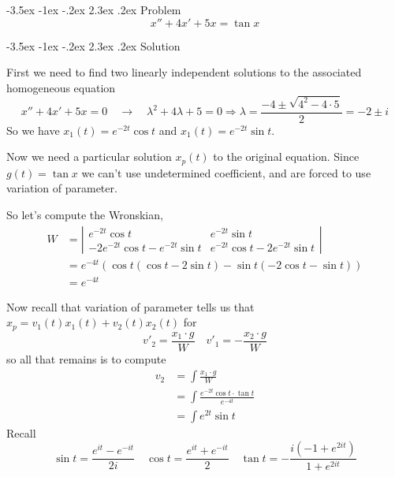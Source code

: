\documentclass[11pt]{article}
\makeatletter
\renewcommand\section{\@startsection{section}{1}{\z@}%
                                  {-3.5ex \@plus -1ex \@minus -.2ex}%
                                  {2.3ex \@plus.2ex}%
                                  {\normalfont\large\bfseries}}
\makeatother
\begin{document}
\section{Problem}
\[ x'' + 4 x' + 5 x = \tan x\]

\section{Solution}

First we need to find two linearly independent solutions to the associated homogeneous equation
\[x'' + 4 x' + 5 x =0 \quad\rightarrow\quad \lambda^2 + 4 \lambda + 5 =0 \Rightarrow \lambda = \frac{-4 \pm \sqrt{4^2 -4 \cdot 5}}{2} = -2 \pm i\]
So we have $x_1(t) = e^{-2 t} \cos{t}$ and $x_1(t) = e^{-2 t} \sin{t}$.

Now we need a particular solution $x_p(t)$ to the original equation. Since $g(t) = \tan x$ we can't use undetermined coefficient, and are forced to use variation of parameter.

So let's compute the Wronskian,
\begin{align*} W &= \left| \begin{array}{cc}  e^{-2 t} \cos{t} & e^{-2 t} \sin{t} \\ -2 e^{-2 t} \cos{t}-e^{-2 t} \sin{t} &  e^{-2 t} \cos{t}-2 e^{-2 t} \sin{t} \end{array}\right| \\ &= e^{-4 t} \left( \cos{t}(\cos{t} - 2 \sin{t}) - \sin{t} (-2 \cos{t} -  \sin{t}) \right) \\ &= e^{-4t}   \end{align*}

Now recall that variation of parameter tells us that $x_p = v_1(t) x_1(t) + v_2(t) x_2(t)$ for
\[v'_2 = \frac{x_1 \cdot g}{W} \quad v'_1 = - \frac{x_2 \cdot g }{W}\]
so all that remains is to compute 
\begin{align*} v_2 &= \int  \frac{x_1 \cdot g}{W}\\ &= \int \frac{e^{-2t} \cos t\cdot \tan t}{e^{-4t}} \\ &= \int e^{2t} \sin t \end{align*}
Recall
\[ \sin t = \frac{ e^{i t} - e^{-i t}}{2 i} \quad \cos t = \frac{e^{it} + e^{-it} }{2} \quad \tan t = -\frac{i \left(-1+e^{2 i t}\right)}{1+e^{2 i t}} \]
\end{document}
